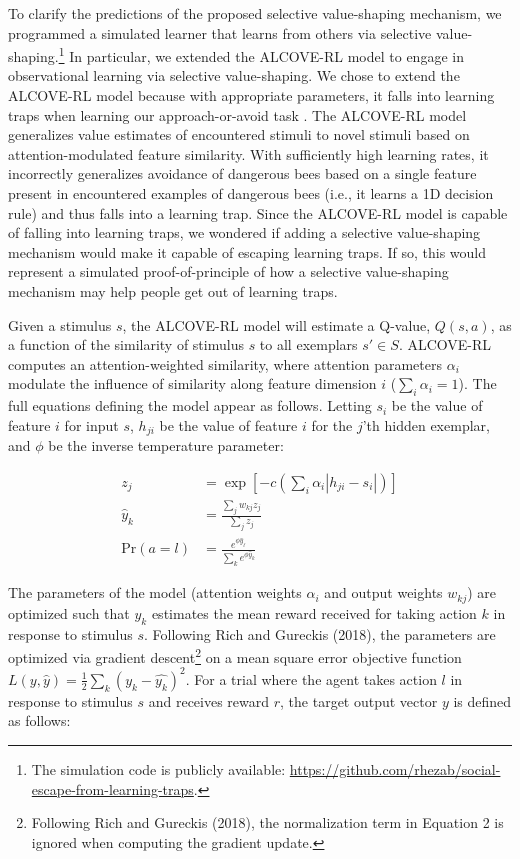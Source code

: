\documentclass[11pt]{article} %
\begin{document}
To clarify the predictions of the proposed selective value-shaping mechanism, we programmed a simulated learner that learns from others via selective value-shaping.\footnote{The simulation code is publicly available: \url{https://github.com/rhezab/social-escape-from-learning-traps}.} In particular, we extended the ALCOVE-RL model \cite{kruschke1992alcove, canasAttentionReinforcementLearning2010} to engage in observational learning via selective value-shaping. We chose to extend the ALCOVE-RL model because with appropriate parameters, it falls into learning traps when learning our approach-or-avoid task \cite{richLimitsLearningExploration2018}. The ALCOVE-RL model generalizes value estimates of encountered stimuli to novel stimuli based on attention-modulated feature similarity. With sufficiently high learning rates, it incorrectly generalizes avoidance of dangerous bees based on a single feature present in encountered examples of dangerous bees (i.e., it learns a 1D decision rule) and thus falls into a learning trap. Since the ALCOVE-RL model is capable of falling into learning traps, we wondered if adding a selective value-shaping mechanism would make it capable of escaping learning traps. If so, this would represent a simulated proof-of-principle of how a selective value-shaping mechanism may help people get out of learning traps. 

Given a stimulus $s$, the ALCOVE-RL model will estimate a Q-value, $Q(s,a)$, as a function of the similarity of stimulus $s$ to all exemplars $s' \in S$. ALCOVE-RL computes an attention-weighted similarity, where attention parameters $\alpha_i$ modulate the influence of similarity along feature dimension $i$ ($\sum_i \alpha_i = 1$). The full equations defining the model appear as follows. Letting $s_i$ be the value of feature $i$ for input $s$, $h_{ji}$ be the value of feature $i$ for the $j$'th hidden exemplar, and $\phi$ be the inverse temperature parameter:


\begin{align}
    z_j &= \exp\left[-c\left(\sum_i \alpha_i |h_{ji} - s_i|\right)\right] \\
    \hat{y}_k &= \frac{\sum_j w_{kj} z_j}{\sum_j z_j} \\
    \text{Pr}(a = l) &= \frac{e^{\phi\hat{y}_\ell}}{\sum_k e^{\phi\hat{y}_k}}
\end{align}

The parameters of the model (attention weights $\alpha_i$ and output weights $w_{kj}$) are optimized such that $y_k$ estimates the mean reward received for taking action $k$ in response to stimulus $s$. Following Rich and Gureckis (2018), the parameters are optimized via gradient descent\footnote{Following Rich and Gureckis (2018), the normalization term in Equation 2 is ignored when computing the gradient update.} on a mean square error objective function $L(y,\hat{y}) = \frac{1}{2} \sum_k (y_k - \hat{y_k})^2$. For a trial where the agent takes action $l$ in response to stimulus $s$ and receives reward $r$, the target output vector $y$ is defined as follows:
\end{document}
